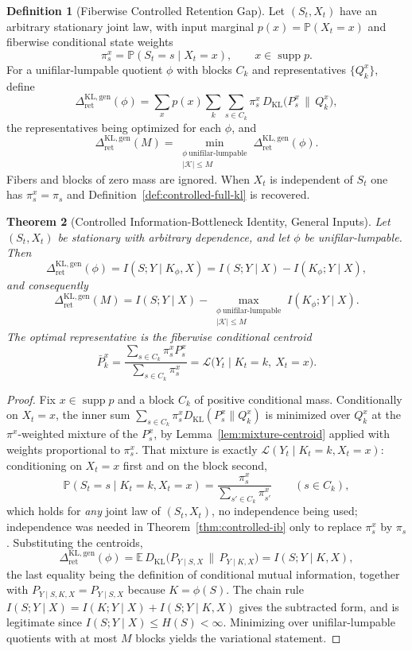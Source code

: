 \documentclass[12pt]{article}
\newtheorem{theorem}{Theorem}[section]
\theoremstyle{definition}
\newtheorem{definition}[theorem]{Definition}
\DeclareMathOperator{\supp}{supp}
\newcommand{\RetKLg}{\Delta_{\mathrm{ret}}^{\mathrm{KL,gen}}}
\begin{document}
\begin{definition}[Fiberwise Controlled Retention Gap]
\label{def:controlled-full-kl-general}
Let $(S_t,X_t)$ have an arbitrary stationary joint law, with input marginal
$p(x)=\mathbb P(X_t=x)$ and fiberwise conditional state weights
\[
\pi_s^x=\mathbb P(S_t=s\mid X_t=x),
\qquad
x\in\supp p .
\]
For a unifilar-lumpable quotient $\phi$ with blocks $C_k$ and representatives
$\{Q_k^x\}$, define
\[
\RetKLg(\phi)
=
\sum_xp(x)\sum_k\sum_{s\in C_k}\pi_s^x\,
D_{\mathrm{KL}}\bigl(P_s^x\,\big\|\,Q_k^x\bigr),
\]
the representatives being optimized for each $\phi$, and
\[
\RetKLg(M)
=
\min_{\substack{\phi\ \text{unifilar-lumpable}\\|\mathcal K|\le M}}
\RetKLg(\phi).
\]
Fibers and blocks of zero mass are ignored.  When $X_t$ is independent of
$S_t$ one has $\pi_s^x=\pi_s$ and
Definition~\ref{def:controlled-full-kl} is recovered.
\end{definition}

\begin{theorem}[Controlled Information-Bottleneck Identity, General Inputs]
\label{thm:controlled-ib-general}
Let $(S_t,X_t)$ be stationary with arbitrary dependence, and let $\phi$ be
unifilar-lumpable.  Then
\[
\RetKLg(\phi)
=
I(S;Y\mid K_\phi,X)
=
I(S;Y\mid X)-I(K_\phi;Y\mid X),
\]
and consequently
\[
\RetKLg(M)
=
I(S;Y\mid X)
-
\max_{\substack{\phi\ \text{unifilar-lumpable}\\|\mathcal K|\le M}}
I(K_\phi;Y\mid X).
\]
The optimal representative is the fiberwise conditional centroid
\[
\bar P_k^x
=
\frac{\sum_{s\in C_k}\pi_s^xP_s^x}{\sum_{s\in C_k}\pi_s^x}
=
\mathcal L\bigl(Y_t\mid K_t=k,\ X_t=x\bigr).
\]
\end{theorem}

\begin{proof}
Fix $x\in\supp p$ and a block $C_k$ of positive conditional mass.  Conditionally
on $X_t=x$, the inner sum $\sum_{s\in C_k}\pi_s^xD_{\mathrm{KL}}(P_s^x\|Q_k^x)$
is minimized over $Q_k^x$ at the $\pi^x$-weighted mixture of the $P_s^x$, by
Lemma~\ref{lem:mixture-centroid} applied with weights proportional to
$\pi_s^x$.  That mixture is exactly
$\mathcal L(Y_t\mid K_t=k,X_t=x)$: conditioning on $X_t=x$ first and on the
block second,
\[
\mathbb P(S_t=s\mid K_t=k,X_t=x)
=
\frac{\pi_s^x}{\sum_{s'\in C_k}\pi_{s'}^x}
\qquad(s\in C_k),
\]
which holds for \emph{any} joint law of $(S_t,X_t)$, no independence being
used; independence was needed in Theorem~\ref{thm:controlled-ib} only to
replace $\pi_s^x$ by $\pi_s$.  Substituting the centroids,
\[
\RetKLg(\phi)
=
\mathbb E\,D_{\mathrm{KL}}
\bigl(P_{Y\mid S,X}\,\big\|\,P_{Y\mid K,X}\bigr)
=
I(S;Y\mid K,X),
\]
the last equality being the definition of conditional mutual information,
together with $P_{Y\mid S,K,X}=P_{Y\mid S,X}$ because $K=\phi(S)$.  The chain
rule $I(S;Y\mid X)=I(K;Y\mid X)+I(S;Y\mid K,X)$ gives the subtracted form, and
is legitimate since $I(S;Y\mid X)\le H(S)<\infty$.  Minimizing over
unifilar-lumpable quotients with at most $M$ blocks yields the variational
statement.
\end{proof}
\end{document}
